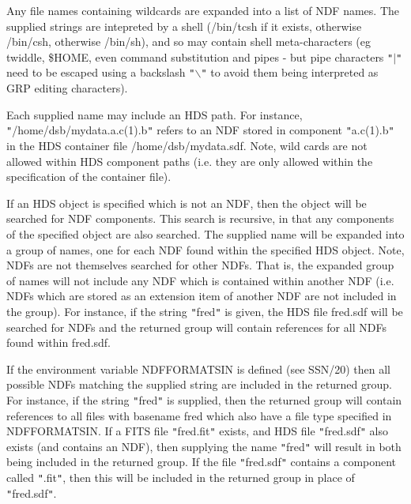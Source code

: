 \documentclass[twoside,11pt]{article}
\renewcommand{\_}{\texttt{\symbol{95}}}
\newcommand{\sstitem}{\item}
\newcommand{\sstitem}{\item}
\begin{document}
{{{         \sstitem
         Any file names containing wildcards are expanded into a list of NDF
         names. The supplied strings are intepreted by a shell (/bin/tcsh if
         it exists, otherwise /bin/csh, otherwise /bin/sh), and so may
         contain shell meta-characters (eg twiddle, \$HOME, even command
         substitution and pipes - but pipe characters {\tt "}$|${\tt "} need to be escaped
         using a backslash {\tt "}$\backslash${\tt "} to avoid them being interpreted as GRP
         editing characters).

         \sstitem
         Each supplied name may include an HDS path. For instance,
         {\tt "}/home/dsb/mydata.a.c(1).b{\tt "} refers to an NDF stored in component
         {\tt "}a.c(1).b{\tt "} in the HDS container file /home/dsb/mydata.sdf. Note,
         wild cards are not allowed within HDS component paths (i.e. they
         are only allowed within the specification of the container file).

         \sstitem
         If an HDS object is specified which is not an NDF, then the
         object will be searched for NDF components. This search is
         recursive, in that any components of the specified object are also
         searched. The supplied name will be expanded into a group of names,
         one for each NDF found within the specified HDS object. Note, NDFs
         are not themselves searched for other NDFs. That is, the expanded
         group of names will not include any NDF which is contained within
         another NDF (i.e. NDFs which are stored as an extension item of
         another NDF are not included in the group). For instance, if the
         string {\tt "}fred{\tt "} is given, the HDS file fred.sdf will be searched for
         NDFs and the returned group will contain references for all NDFs
         found within fred.sdf.

         \sstitem
         If the environment variable NDF\_FORMATS\_IN is defined (see
         SSN/20) then all possible NDFs matching the supplied string are
         included in the returned group. For instance, if the string {\tt "}fred{\tt "}
         is supplied, then the returned group will contain references to all
         files with basename fred which also have a file type specified in
         NDF\_FORMATS\_IN. If a FITS file {\tt "}fred.fit{\tt "} exists, and HDS file
         {\tt "}fred.sdf{\tt "} also exists (and contains an NDF), then supplying the
         name {\tt "}fred{\tt "} will result in both being included in the returned
         group. If the file {\tt "}fred.sdf{\tt "} contains a component called {\tt "}.fit{\tt "},
         then this will be included in the returned group in place of
         {\tt "}fred.sdf{\tt "}.

}}}
\end{document}

